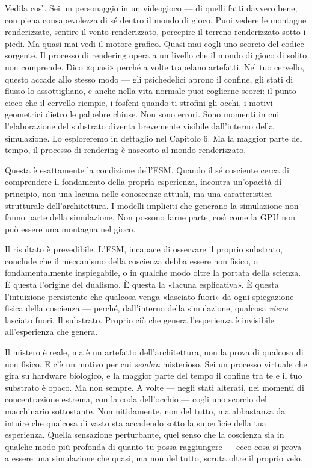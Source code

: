 \documentclass[11pt, twoside, openright]{book}
\begin{document}
Vedila così. Sei un personaggio in un videogioco --- di quelli fatti davvero bene, con piena consapevolezza di sé dentro il mondo di gioco. Puoi vedere le montagne renderizzate, sentire il vento renderizzato, percepire il terreno renderizzato sotto i piedi. Ma quasi mai vedi il motore grafico. Quasi mai cogli uno scorcio del codice sorgente. Il processo di rendering opera a un livello che il mondo di gioco di solito non comprende. Dico «quasi» perché a volte trapelano artefatti. Nel tuo cervello, questo accade allo stesso modo --- gli psichedelici aprono il confine, gli stati di flusso lo assottigliano, e anche nella vita normale puoi coglierne scorci: il punto cieco che il cervello riempie, i fosfeni quando ti strofini gli occhi, i motivi geometrici dietro le palpebre chiuse. Non sono errori. Sono momenti in cui l'elaborazione del substrato diventa brevemente visibile dall'interno della simulazione. Lo esploreremo in dettaglio nel Capitolo 6. Ma la maggior parte del tempo, il processo di rendering è nascosto al mondo renderizzato.

Questa è esattamente la condizione dell'ESM. Quando il sé cosciente cerca di comprendere il fondamento della propria esperienza, incontra un'opacità di principio, non una lacuna nelle conoscenze attuali, ma una caratteristica strutturale dell'architettura. I modelli impliciti che generano la simulazione non fanno parte della simulazione. Non possono farne parte, così come la GPU non può essere una montagna nel gioco.

Il risultato è prevedibile. L'ESM, incapace di osservare il proprio substrato, conclude che il meccanismo della coscienza debba essere non fisico, o fondamentalmente inspiegabile, o in qualche modo oltre la portata della scienza. È questa l'origine del dualismo. È questa la «lacuna esplicativa». È questa l'intuizione persistente che qualcosa venga «lasciato fuori» da ogni spiegazione fisica della coscienza --- perché, dall'interno della simulazione, qualcosa \textit{viene} lasciato fuori. Il substrato. Proprio ciò che genera l'esperienza è invisibile all'esperienza che genera.

Il mistero è reale, ma è un artefatto dell'architettura, non la prova di qualcosa di non fisico. E c'è un motivo per cui \textit{sembra} misterioso. Sei un processo virtuale che gira su hardware biologico, e la maggior parte del tempo il confine tra te e il tuo substrato è opaco. Ma non sempre. A volte --- negli stati alterati, nei momenti di concentrazione estrema, con la coda dell'occhio --- cogli uno scorcio del macchinario sottostante. Non nitidamente, non del tutto, ma abbastanza da intuire che qualcosa di vasto sta accadendo sotto la superficie della tua esperienza. Quella sensazione perturbante, quel senso che la coscienza sia in qualche modo più profonda di quanto tu possa raggiungere --- ecco cosa si prova a essere una simulazione che quasi, ma non del tutto, scruta oltre il proprio velo.
\end{document}
